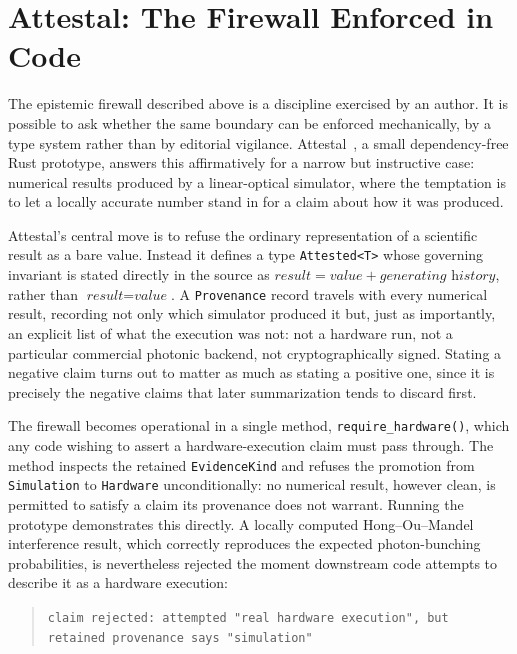 \documentclass[11pt]{article}
\begin{document}
\section{Attestal: The Firewall Enforced in Code}
\label{sec:attestal}

The epistemic firewall described above is a discipline exercised by an author. It is possible to ask whether the same boundary can be enforced mechanically, by a type system rather than by editorial vigilance. Attestal~\cite{attestal}, a small dependency-free Rust prototype, answers this affirmatively for a narrow but instructive case: numerical results produced by a linear-optical simulator, where the temptation is to let a locally accurate number stand in for a claim about how it was produced.

Attestal's central move is to refuse the ordinary representation of a scientific result as a bare value. Instead it defines a type \texttt{Attested<T>} whose governing invariant is stated directly in the source as $\textit{result} = \textit{value} + \textit{generating history}$, rather than $\textit{result} = \textit{value}$. A \texttt{Provenance} record travels with every numerical result, recording not only which simulator produced it but, just as importantly, an explicit list of what the execution was not: not a hardware run, not a particular commercial photonic backend, not cryptographically signed. Stating a negative claim turns out to matter as much as stating a positive one, since it is precisely the negative claims that later summarization tends to discard first.

The firewall becomes operational in a single method, \texttt{require\_hardware()}, which any code wishing to assert a hardware-execution claim must pass through. The method inspects the retained \texttt{EvidenceKind} and refuses the promotion from \texttt{Simulation} to \texttt{Hardware} unconditionally: no numerical result, however clean, is permitted to satisfy a claim its provenance does not warrant. Running the prototype demonstrates this directly. A locally computed Hong--Ou--Mandel interference result, which correctly reproduces the expected photon-bunching probabilities, is nevertheless rejected the moment downstream code attempts to describe it as a hardware execution:

\begin{quote}
\texttt{claim rejected: attempted "real hardware execution", but retained provenance says "simulation"}
\end{quote}
\end{document}
